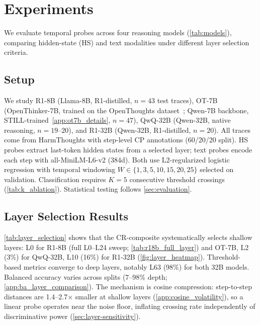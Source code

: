 \section{Experiments}\label{sec:experiments}

We evaluate temporal probes across four reasoning models (\cref{tab:models}), comparing hidden-state (HS) and text modalities under different layer selection criteria.

\subsection{Setup}\label{sec:setup}

We study R1-8B (Llama-8B, R1-distilled, $n{=}43$ test traces), OT-7B (OpenThinker-7B, trained on the OpenThoughts dataset~\citep{openthinker}; Qwen-7B backbone, STILL-trained~\cref{app:ot7b_details}, $n{=}47$), QwQ-32B (Qwen-32B, native reasoning, $n{=}19$--$20$), and R1-32B (Qwen-32B, R1-distilled, $n{=}20$). All traces come from HarmThoughts with step-level CP annotations (60/20/20 split). HS probes extract last-token hidden states from a selected layer; text probes encode each step with all-MiniLM-L6-v2 (384d). Both use L2-regularized logistic regression with temporal windowing $W \in \{1, 3, 5, 10, 15, 20, 25\}$ selected on validation. Classification requires $K{=}5$ consecutive threshold crossings (\cref{tab:k_ablation}). Statistical testing follows \cref{sec:evaluation}.

\subsection{Layer Selection Results}\label{sec:layer-results}

\cref{tab:layer_selection} shows that the CR-composite systematically selects shallow layers: L0 for R1-8B (full L0--L24 sweep; \cref{tab:r18b_full_layer}) and OT-7B, L2 (3\%) for QwQ-32B, L10 (16\%) for R1-32B (\cref{fig:layer_heatmap}). Threshold-based metrics converge to deep layers, notably L63 (98\%) for both 32B models. Balanced accuracy varies across splits (7--98\% depth; \cref{app:ba_layer_comparison}). The mechanism is cosine compression: step-to-step distances are 1.4--2.7$\times$ smaller at shallow layers (\cref{app:cosine_volatility}), so a linear probe operates near the noise floor, inflating crossing rate independently of discriminative power (\cref{sec:layer-sensitivity}).


